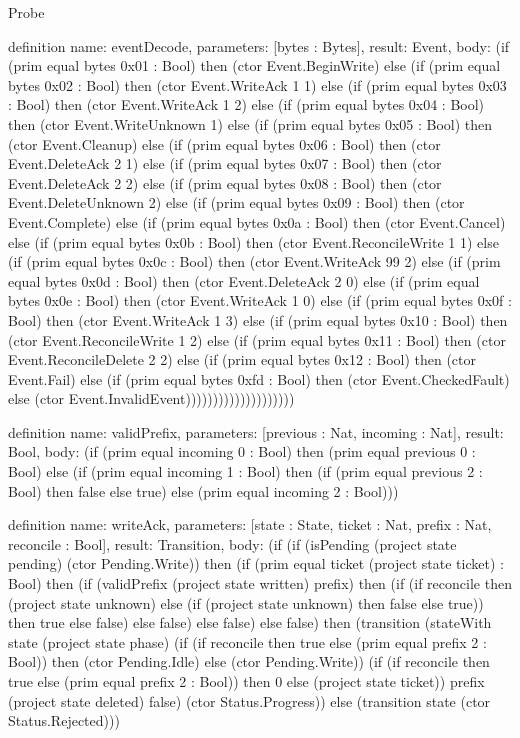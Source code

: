 \begin{lexlean}{Probe}
\begin{semanticmodule}
definition{
  name: eventDecode,
  parameters: [bytes : Bytes],
  result: Event,
  body: (if (prim equal bytes 0x01 : Bool) then (ctor Event.BeginWrite) else (if (prim equal bytes 0x02 : Bool) then (ctor Event.WriteAck 1 1) else (if (prim equal bytes 0x03 : Bool) then (ctor Event.WriteAck 1 2) else (if (prim equal bytes 0x04 : Bool) then (ctor Event.WriteUnknown 1) else (if (prim equal bytes 0x05 : Bool) then (ctor Event.Cleanup) else (if (prim equal bytes 0x06 : Bool) then (ctor Event.DeleteAck 2 1) else (if (prim equal bytes 0x07 : Bool) then (ctor Event.DeleteAck 2 2) else (if (prim equal bytes 0x08 : Bool) then (ctor Event.DeleteUnknown 2) else (if (prim equal bytes 0x09 : Bool) then (ctor Event.Complete) else (if (prim equal bytes 0x0a : Bool) then (ctor Event.Cancel) else (if (prim equal bytes 0x0b : Bool) then (ctor Event.ReconcileWrite 1 1) else (if (prim equal bytes 0x0c : Bool) then (ctor Event.WriteAck 99 2) else (if (prim equal bytes 0x0d : Bool) then (ctor Event.DeleteAck 2 0) else (if (prim equal bytes 0x0e : Bool) then (ctor Event.WriteAck 1 0) else (if (prim equal bytes 0x0f : Bool) then (ctor Event.WriteAck 1 3) else (if (prim equal bytes 0x10 : Bool) then (ctor Event.ReconcileWrite 1 2) else (if (prim equal bytes 0x11 : Bool) then (ctor Event.ReconcileDelete 2 2) else (if (prim equal bytes 0x12 : Bool) then (ctor Event.Fail) else (if (prim equal bytes 0xfd : Bool) then (ctor Event.CheckedFault) else (ctor Event.InvalidEvent))))))))))))))))))))
}

definition{
  name: validPrefix,
  parameters: [previous : Nat, incoming : Nat],
  result: Bool,
  body: (if (prim equal incoming 0 : Bool) then (prim equal previous 0 : Bool) else (if (prim equal incoming 1 : Bool) then (if (prim equal previous 2 : Bool) then false else true) else (prim equal incoming 2 : Bool)))
}

definition{
  name: writeAck,
  parameters: [state : State, ticket : Nat, prefix : Nat, reconcile : Bool],
  result: Transition,
  body: (if (if (isPending (project state pending) (ctor Pending.Write)) then (if (prim equal ticket (project state ticket) : Bool) then (if (validPrefix (project state written) prefix) then (if (if reconcile then (project state unknown) else (if (project state unknown) then false else true)) then true else false) else false) else false) else false) then (transition (stateWith state (project state phase) (if (if reconcile then true else (prim equal prefix 2 : Bool)) then (ctor Pending.Idle) else (ctor Pending.Write)) (if (if reconcile then true else (prim equal prefix 2 : Bool)) then 0 else (project state ticket)) prefix (project state deleted) false) (ctor Status.Progress)) else (transition state (ctor Status.Rejected)))
}


\end{semanticmodule}
\end{lexlean}

